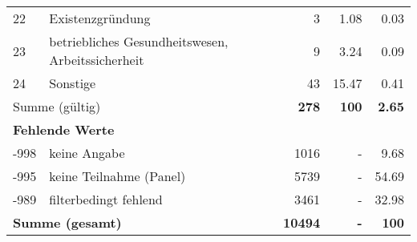 \begin{longtable}{lXrrr}
        22 & \multicolumn{1}{X}{Existenzgründung} & %
          \num{3} &
          \num[round-mode=places,round-precision=2]{1.08} &
          \num[round-mode=places,round-precision=2]{0.03} \\

        23 & \multicolumn{1}{X}{betriebliches Gesundheitswesen, Arbeitssicherheit} & %
          \num{9} &
          \num[round-mode=places,round-precision=2]{3.24} &
          \num[round-mode=places,round-precision=2]{0.09} \\

        24 & \multicolumn{1}{X}{Sonstige} & %
          \num{43} &
          \num[round-mode=places,round-precision=2]{15.47} &
          \num[round-mode=places,round-precision=2]{0.41} \\

     \midrule
     \multicolumn{2}{l}{Summe (gültig)} &
       \textbf{\num{278}} &
     \textbf{\num{100}} &
       \textbf{\num[round-mode=places,round-precision=2]{2.65}} \\
     \multicolumn{5}{l}{\textbf{Fehlende Werte}}\\
       -998 &
       keine Angabe &
         \num{1016} &
        - &
         \num[round-mode=places,round-precision=2]{9.68} \\
       -995 &
       keine Teilnahme (Panel) &
         \num{5739} &
        - &
         \num[round-mode=places,round-precision=2]{54.69} \\
       -989 &
       filterbedingt fehlend &
         \num{3461} &
        - &
         \num[round-mode=places,round-precision=2]{32.98} \\
     \midrule
     \multicolumn{2}{l}{\textbf{Summe (gesamt)}} &
          \textbf{\num{10494}} &
        \textbf{-} &
        \textbf{\num{100}} \\
     \bottomrule
     \end{longtable}
     
